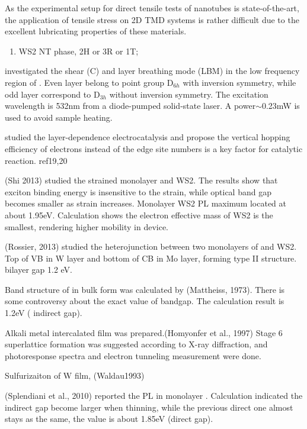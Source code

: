 As the experimental setup for direct tensile tests of nanotubes is state-of-the-art,\cite{Tang2013} the application of tensile stress on 2D TMD systems is rather difficult due to the excellent lubricating properties of these materials.

\begin{enumerate}
\item WS2 NT phase, 2H or 3R or 1T;

\end{enumerate}


\citeauthor{Zhang2013e} investigated the shear (C) and layer breathing mode (LBM) in the low frequency region of .\cite{Zhang2013e} Even layer  belong to point group D$_{6h}$ with inversion symmetry, while odd layer  correspond to D$_{3h}$ without inversion symmetry. The excitation wavelength is 532nm from a diode-pumped solid-state laser. A power$\sim$0.23mW is used to avoid sample heating.

\citeauthor{Cao2014} studied the layer-dependence  electrocatalysis and propose the vertical hopping efficiency of electrons instead of the edge site numbers is a key factor for catalytic reaction.\cite{Cao2014} ref19,20


(Shi 2013) studied the strained monolayer  and WS2. The results show that exciton binding energy is insensitive to the strain, while optical band gap becomes smaller as strain increases. Monolayer WS2 PL maximum located at about 1.95eV. Calculation shows the electron effective mass of WS2 is the smallest, rendering higher mobility in device.

(Rossier, 2013) studied the heterojunction between two monolayers of  and WS2. Top of VB in W layer and bottom of CB in Mo layer, forming type II structure. bilayer gap 1.2 eV.


Band structure  of  in bulk form was calculated by (Mattheiss, 1973). There is some controversy about the exact value of bandgap. The calculation result is 1.2eV ( indirect gap).\cite{Mattheiss1973}

Alkali metal intercalated  film was prepared.(Homyonfer et al., 1997) Stage 6 superlattice formation was suggested according to X-ray diffraction, and photoresponse spectra and electron tunneling measurement were done.

Sulfurizaiton of W film, (Waldau1993)

(Splendiani et al., 2010) reported the PL in monolayer .  Calculation indicated the indirect gap become larger when thinning, while the previous direct one almost stays as the same, the value is about 1.85eV (direct gap).\cite{Splendiani2010}

